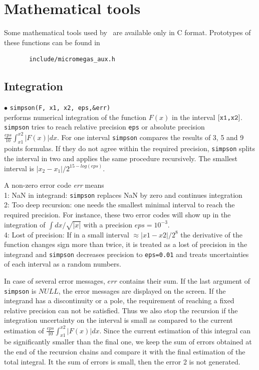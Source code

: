 \documentclass[12pt,a4paper]{article}
\begin{document}
\section{Mathematical tools}

Some mathematical tools used by \micro\ are available only 
in C format. Prototypes of these functions can be found in
\begin{verbatim}
       include/micromegas_aux.h 
\end{verbatim}

\subsection{Integration}

\noindent$\bullet$ \verb|simpson(F, x1, x2, eps,&err)|\\
performs numerical integration of the function $F(x)$ in the interval $[\verb|x1,x2|]$.
{\tt simpson} tries to reach  relative precision \verb|eps| or absolute precision $\frac{eps}{10}
\int_{x1}^{x2}|F(x)|dx$.  
For one  interval {\tt simpson} compares the results of  3, 5 and 9 points formulas.
If they do not agree within the  required precision, {\tt simpson} splits the interval in two 
and applies the same procedure  recursively. The smallest interval is $|x_2-x_1|/2^{15-log(eps)}$. 

A non-zero error code {\it err} means\\
1: NaN in integrand:  \verb|simpson| replaces NaN by zero and continues integration\\
2: Too deep recursion:  one needs the smallest minimal interval to reach the required precision.   For instance, these two error codes
will show up  in the  integration of   $\int dx/\sqrt{|x|}$  with a precision  $eps=10^{-3}$.  \\
4: Lost of precision:   If in a small interval $\approx |x1-x2|/2^8$ the derivative of the 
function  changes  sign more than twice, it is treated as a lost of precision in the integrand and  \verb|simpson|
decreases precision to {\tt eps=0.01} and treats uncertainties of each interval as a random
numbers. 

In case of several error messages, $err$ contains their sum.  If the last argument of \verb|simpson| is $NULL$, the error messages are displayed on  the screen. If the integrand has a discontinuity or a pole, the requirement  of reaching a fixed relative precision can not be satisfied. Thus  we also stop the recursion if the integration uncertainty on the interval is small as compared to the current estimation of $\frac{eps}{10} \int_{x1}^{x2}|F(x)|dx$. Since the current estimation of this integral can be significantly smaller than the final one,   we keep the sum of errors obtained at  the end of the recursion chains  and compare it with the final estimation of the  total integral. It the sum of errors is small, then the error 2 is not generated.  \\
\end{document}
